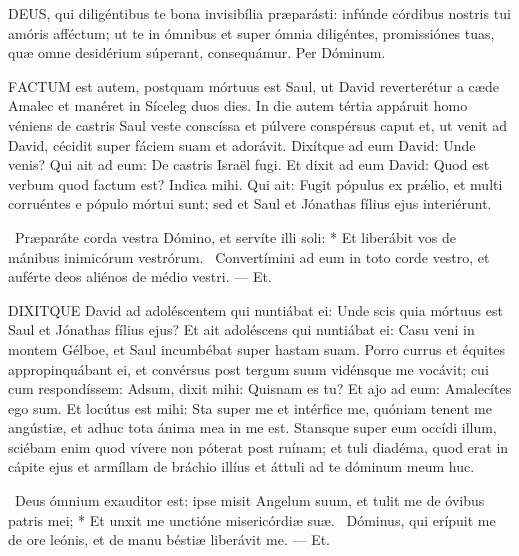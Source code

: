 
\lettrine[lines=2]{D}{EUS}, qui diligéntibus te bona invisibília præparásti: infúnde córdibus nostris tui amóris afféctum; ut te in ómnibus et super ómnia diligéntes, promissiónes tuas, quæ omne desidérium súperant, consequámur. Per Dóminum.






\lettrine[lines=2]{F}{ACTUM} est autem, postquam mórtuus est Saul, ut David reverterétur a cæde Amalec et manéret in Síceleg duos dies. In die autem tértia appáruit homo véniens de castris Saul veste conscíssa et púlvere conspérsus caput et, ut venit ad David, cécidit super fáciem suam et adorávit. Dixítque ad eum David: Unde venis? Qui ait ad eum: De castris Israël fugi. Et dixit ad eum David: Quod est verbum quod factum est? Indica mihi. Qui ait: Fugit pópulus ex prǽlio, et multi corruéntes e pópulo mórtui sunt; sed et Saul et Jónathas fílius ejus interiérunt.

\R\ Præparáte corda vestra Dómino, et servíte illi soli: * Et liberábit vos de mánibus inimicórum vestrórum. \V\ Convertímini ad eum in toto corde vestro, et auférte deos aliénos de médio vestri. --- Et.


\lettrine[lines=2]{D}{IXITQUE} David ad adoléscentem qui nuntiábat ei: Unde scis quia mórtuus est Saul et Jónathas fílius ejus? Et ait adoléscens qui nuntiábat ei: Casu veni in montem Gélboe, et Saul incumbébat super hastam suam. Porro currus et équites appropinquábant ei, et convérsus post tergum suum vidénsque me vocávit; cui cum respondíssem: Adsum, dixit mihi: Quisnam es tu? Et ajo ad eum: Amalecítes ego sum. Et locútus est mihi: Sta super me et intérfice me, quóniam tenent me angústiæ, et adhuc tota ánima mea in me est. Stansque super eum occídi illum, sciébam enim quod vívere non póterat post ruínam; et tuli diadéma, quod erat in cápite ejus et armíllam de bráchio illíus et áttuli ad te dóminum meum huc.

\R\ Deus ómnium exauditor est: ipse misit Angelum suum, et tulit me de óvibus patris mei; * Et unxit me unctióne misericórdiæ suæ. \V\ Dóminus, qui erípuit me de ore leónis, et de manu béstiæ liberávit me. --- Et.

